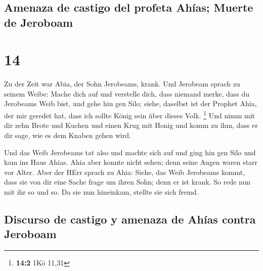 \hypertarget{amenaza-de-castigo-del-profeta-ahuxedas-muerte-de-jeroboam}{%
\subsection{Amenaza de castigo del profeta Ahías; Muerte de
Jeroboam}\label{amenaza-de-castigo-del-profeta-ahuxedas-muerte-de-jeroboam}}

\hypertarget{section-13}{%
\section{14}\label{section-13}}

 Zu der Zeit war Abia, der Sohn Jerobeams, krank.
 Und Jerobeam sprach zu seinem Weibe: Mache dich auf und
verstelle dich, dass niemand merke, dass du Jerobeams Weib bist, und
gehe hin gen Silo; siehe, daselbst ist der Prophet Ahia, der mir geredet
hat, dass ich sollte König sein über dieses Volk. \footnote{\textbf{14:2}
  1Kö 11,31}  Und nimm mit dir zehn Brote und Kuchen und
einen Krug mit Honig und komm zu ihm, dass er dir sage, wie es dem
Knaben gehen wird.

 Und das Weib Jerobeams tat also und machte sich auf und
ging hin gen Silo und kam ins Haus Ahias. Ahia aber konnte nicht sehen;
denn seine Augen waren starr vor Alter.  Aber der HErr
sprach zu Ahia: Siehe, das Weib Jerobeams kommt, dass sie von dir eine
Sache frage um ihren Sohn; denn er ist krank. So rede nun mit ihr so und
so. Da sie nun hineinkam, stellte sie sich fremd.

\hypertarget{discurso-de-castigo-y-amenaza-de-ahuxedas-contra-jeroboam}{%
\subsection{Discurso de castigo y amenaza de Ahías contra
Jeroboam}\label{discurso-de-castigo-y-amenaza-de-ahuxedas-contra-jeroboam}}

